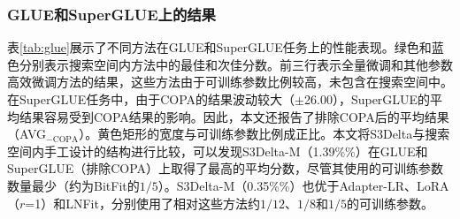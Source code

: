 
\subsubsection{GLUE和SuperGLUE上的结果}
\label{sec:resultsonglue}
表\ref{tab:glue}展示了不同方法在GLUE和SuperGLUE任务上的性能表现。\colorbox{themegreen}{绿色}和\colorbox{themeblue}{蓝色}分别表示搜索空间内方法中的最佳和次佳分数。前三行表示全量微调和其他参数高效微调方法的结果，这些方法由于可训练参数比例较高，未包含在搜索空间中。在SuperGLUE任务中，由于COPA的结果波动较大（$\pm$26.00），SuperGLUE的平均结果容易受到COPA结果的影响。因此，本文还报告了排除COPA后的平均结果（AVG$_{-\text{COPA}}$）。黄色矩形的宽度与可训练参数比例成正比。本文将S3Delta与搜索空间内手工设计的结构进行比较，可以发现S3Delta-M（1.39\%\%）在GLUE和SuperGLUE（排除COPA）上取得了最高的平均分数，尽管其使用的可训练参数数量最少（约为BitFit的$1/5$）。S3Delta-M（0.35\%\%）也优于Adapter-LR、LoRA（$r$=1）和LNFit，分别使用了相对这些方法约$1/12$、$1/8$和$1/5$的可训练参数。

